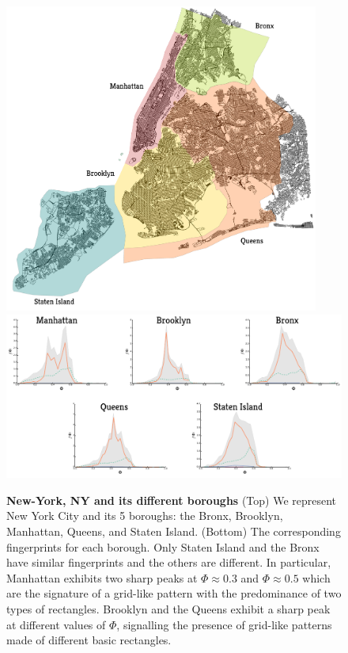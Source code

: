 \begin{figure}
    \includegraphics[height=4in]{./gfx/chapter-networks/ny_boroughs.pdf}
    \includegraphics[width=\textwidth]{./gfx/chapter-networks/boroughs_distributions.pdf}
    \caption{{\bf New-York, NY and its different boroughs} \label{fig:ny-boroughs}
    (Top) We represent New York City and its 5 boroughs: the Bronx, Brooklyn,
    Manhattan, Queens, and Staten Island. (Bottom) The corresponding fingerprints
    for each borough. Only Staten Island and the Bronx have similar fingerprints and
    the others are different. In particular,  Manhattan exhibits two sharp peaks at
    $\Phi \approx 0.3$ and $\Phi \approx 0.5$ which are the signature of a grid-like
    pattern with the predominance of two types of rectangles. Brooklyn and the
    Queens exhibit a sharp peak at different values of $\Phi$, signalling the
    presence of grid-like patterns made of different basic
    rectangles.\label{fig:boroughs}}
\end{figure}


